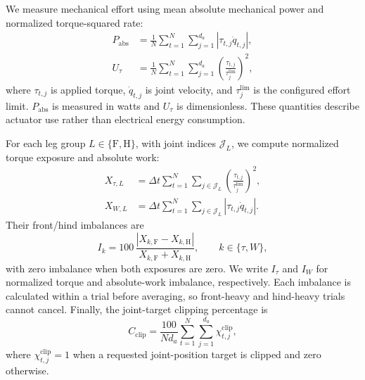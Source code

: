 We measure mechanical effort using mean absolute mechanical power and normalized torque-squared rate:
\begin{equation}
\begin{aligned}
    P_{\mathrm{abs}}&=\frac{1}{N}\sum_{t=1}^{N}\sum_{j=1}^{d_a}\left|\tau_{t,j}\dot q_{t,j}\right|,\\
    U_\tau&=\frac{1}{N}\sum_{t=1}^{N}\sum_{j=1}^{d_a}\left(\frac{\tau_{t,j}}{\tau_j^{\mathrm{lim}}}\right)^2,
\end{aligned}
\label{eq:loco_effort_metrics}
\end{equation}
where $\tau_{t,j}$ is applied torque, $\dot q_{t,j}$ is joint velocity, and $\tau_j^{\mathrm{lim}}$ is the configured effort limit. $P_{\mathrm{abs}}$ is measured in watts and $U_\tau$ is dimensionless. These quantities describe actuator use rather than electrical energy consumption.

For each leg group $L\in\{\mathrm F,\mathrm H\}$, with joint indices $\mathcal J_L$, we compute normalized torque exposure and absolute work:
\begin{equation}
\begin{aligned}
    X_{\tau,L}&=\Delta t\sum_{t=1}^{N}\sum_{j\in\mathcal J_L}\left(\frac{\tau_{t,j}}{\tau_j^{\mathrm{lim}}}\right)^2,\\
    X_{W,L}&=\Delta t\sum_{t=1}^{N}\sum_{j\in\mathcal J_L}\left|\tau_{t,j}\dot q_{t,j}\right|.
\end{aligned}
\label{eq:loco_leg_exposures}
\end{equation}
Their front/hind imbalances are
\begin{equation}
    I_k=100\,\frac{|X_{k,\mathrm F}-X_{k,\mathrm H}|}{X_{k,\mathrm F}+X_{k,\mathrm H}},
    \qquad k\in\{\tau,W\},
    \label{eq:loco_load_imbalance}
\end{equation}
with zero imbalance when both exposures are zero. We write $I_\tau$ and $I_W$ for normalized torque and absolute-work imbalance, respectively. Each imbalance is calculated within a trial before averaging, so front-heavy and hind-heavy trials cannot cancel. Finally, the joint-target clipping percentage is
\begin{equation}
    C_{\mathrm{clip}}=\frac{100}{N d_a}\sum_{t=1}^{N}\sum_{j=1}^{d_a}\chi_{t,j}^{\mathrm{clip}},
    \label{eq:loco_clipping}
\end{equation}
where $\chi_{t,j}^{\mathrm{clip}}=1$ when a requested joint-position target is clipped and zero otherwise.

